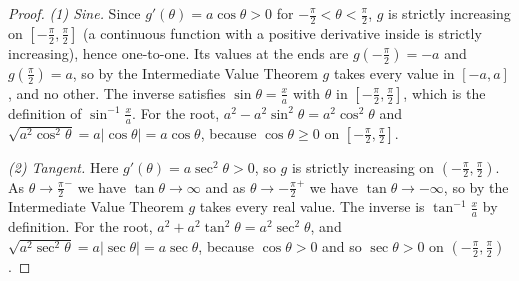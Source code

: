 \documentclass[11pt]{article}
\begin{document}
\begin{proof}
\emph{(1) Sine.} Since $g'(\theta)=a\cos\theta>0$ for $-\frac\pi2<\theta<\frac\pi2$, $g$ is strictly increasing on $\left[-\frac\pi2,\frac\pi2\right]$ (a continuous function with a positive derivative inside is strictly increasing), hence one-to-one. Its values at the ends are $g\left(-\frac\pi2\right)=-a$ and $g\left(\frac\pi2\right)=a$, so by the Intermediate Value Theorem $g$ takes every value in $[-a,a]$, and no other. The inverse satisfies $\sin\theta=\frac xa$ with $\theta$ in $\left[-\frac\pi2,\frac\pi2\right]$, which is the definition of $\sin^{-1}\frac xa$. For the root, $a^2-a^2\sin^2\theta=a^2\cos^2\theta$ and $\sqrt{a^2\cos^2\theta}=a\lvert\cos\theta\rvert=a\cos\theta$, because $\cos\theta\ge0$ on $\left[-\frac\pi2,\frac\pi2\right]$.

\emph{(2) Tangent.} Here $g'(\theta)=a\sec^2\theta>0$, so $g$ is strictly increasing on $\left(-\frac\pi2,\frac\pi2\right)$. As $\theta\to\frac\pi2^-$ we have $\tan\theta\to\infty$ and as $\theta\to-\frac\pi2^+$ we have $\tan\theta\to-\infty$, so by the Intermediate Value Theorem $g$ takes every real value. The inverse is $\tan^{-1}\frac xa$ by definition. For the root, $a^2+a^2\tan^2\theta=a^2\sec^2\theta$, and $\sqrt{a^2\sec^2\theta}=a\lvert\sec\theta\rvert=a\sec\theta$, because $\cos\theta>0$ and so $\sec\theta>0$ on $\left(-\frac\pi2,\frac\pi2\right)$.


\end{proof}
\end{document}
